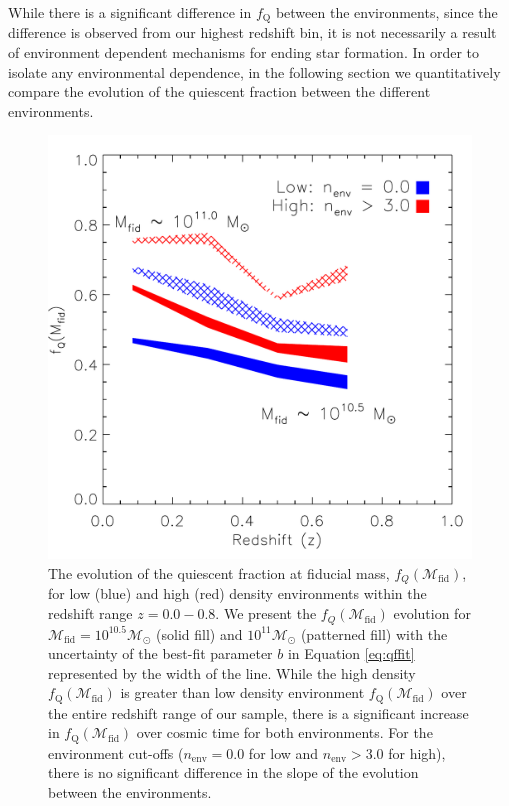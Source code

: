 While there is a significant difference in $f_{\mathrm{Q}}$ between the
environments, since the difference is observed from our highest
redshift bin, it is not necessarily a result of environment dependent
mechanisms for ending star formation. In order to isolate any
environmental dependence, in the following section we quantitatively
compare the evolution of the quiescent fraction between the different
environments.

\begin{figure}
\begin{center}
\includegraphics[width=\textwidth]{figs/qfenv/fig5.pdf}
\caption{The evolution of the quiescent fraction at fiducial
  mass, $f_{Q}(\mathcal{M}_{\mathrm{fid}})$, for low (blue) and
  high (red) density environments within the redshift range $z
  = 0.0 - 0.8$. We present the $f_{Q}(\mathcal{M}_{\mathrm{fid}})$
  evolution for $\mathcal{M}_{\mathrm{fid}} = 10^{10.5}
  \mathcal{M}_\odot$ (solid fill) and $10^{11}
  \mathcal{M}_\odot$ (patterned fill) with the uncertainty of
  the best-fit parameter $b$ in Equation \ref{eq:qffit}
  represented by the width of the line. While the high density $f_{\mathrm{Q}}(\mathcal{M}_{\mathrm{fid}})$ is greater than low density environment $f_{\mathrm{Q}}(\mathcal{M}_{\mathrm{fid}})$ over the entire redshift range of our sample, there is a significant increase in $f_{\mathrm{Q}}(\mathcal{M}_{\mathrm{fid}})$ over cosmic time for both environments. For the environment cut-offs ($n_{\mathrm{env}} =0.0 $ for low and $n_{\mathrm{env}} > 3.0$ for high), there is no significant difference in the slope of the evolution between the environments.}         \label{fig:qffit}
\end{center}
\end{figure}

